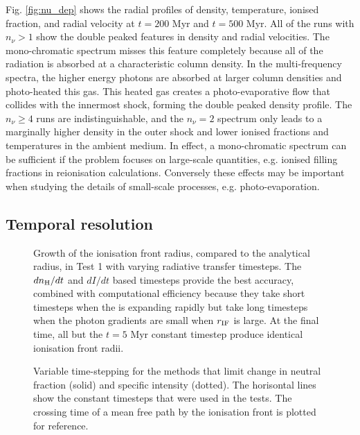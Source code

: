 \documentclass[useAMS,usenatbib]{mn2e}
\begin{document}
Fig. \ref{fig:nu_dep} shows the radial profiles of density,
temperature, ionised fraction, and radial velocity at $t = 200$ Myr
and $t = 500$ Myr.  All of the runs with $n_\nu > 1$ show the double
peaked features in density and radial velocities.  The mono-chromatic
spectrum misses this feature completely because all of the radiation
is absorbed at a characteristic column density.  In the
multi-frequency spectra, the higher energy photons are absorbed at
larger column densities and photo-heated this gas.  This heated gas
creates a photo-evaporative flow that collides with the innermost
shock, forming the double peaked density profile.  The $n_\nu \ge 4$
runs are indistinguishable, and the $n_\nu = 2$ spectrum only leads to
a marginally higher density in the outer shock and lower ionised
fractions and temperatures in the ambient medium.  In effect, a
mono-chromatic spectrum can be sufficient if the problem focuses on
large-scale quantities, e.g. ionised filling fractions in reionisation
calculations.  Conversely these effects may be important when studying
the details of small-scale processes, e.g. photo-evaporation.

\subsection{Temporal resolution}
\label{sec:dt_dep}

\begin{figure}
  \caption{\label{fig:dt_dep1} Growth of the ionisation front radius,
    compared to the analytical radius, in Test 1 with varying
    radiative transfer timesteps.  The $dn_{\rm H}/dt$ and $dI/dt$
    based timesteps provide the best accuracy, combined with
    computational efficiency because they take short timesteps when
    the \hii is expanding rapidly but take long timesteps when
    the photon gradients are small when $r_{\rm IF}$ is large.  At the
    final time, all but the $t = 5$ Myr constant timestep produce
    identical ionisation front radii.}
\end{figure}
\begin{figure}
  \caption{\label{fig:dt_dep2} Variable time-stepping for the methods
    that limit change in neutral fraction (solid) and specific
    intensity (dotted).  The horisontal lines show the constant
    timesteps that were used in the tests.  The crossing time of a
    mean free path by the ionisation front is plotted for reference.}
\end{figure}
\end{document}
